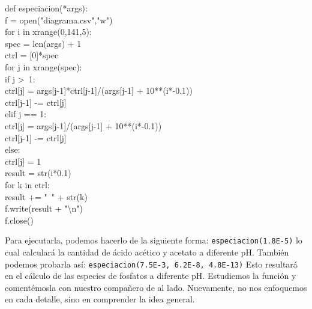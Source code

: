 \documentclass[10pt,letterpaper]{article}
\newcommand{\inlinecode}[1]{
\colorbox{light-gray}{\texttt{#1}}
}
\newenvironment{Code}
{
\begin{lrbox}{\selvestebox}%
\begin{minipage}{\dimexpr\columnwidth-2\fboxsep\relax}
\fontfamily{\ttdefault}\selectfont
}
{\end{minipage}\end{lrbox}%
\begin{center}
\colorbox{light-gray}{\usebox{\selvestebox}}
\end{center}
}
\begin{document}
\begin{Code}
def especiacion(*args):\\
\hspace*{6mm} f = open("diagrama.csv","w")\\
\hspace*{6mm} for i in xrange(0,141,5):\\
\hspace*{13mm} spec = len(args) + 1\\
\hspace*{13mm} ctrl = [0]*spec\\
\hspace*{13mm} for j in xrange(spec):\\
\hspace*{21mm} if j >\ 1:\\
\hspace*{28mm} ctrl[j] = args[j-1]*ctrl[j-1]/(args[j-1] + 10**(i*-0.1))\\
\hspace*{28mm} ctrl[j-1] -= ctrl[j]\\
\hspace*{21mm} elif j == 1:\\
\hspace*{28mm} ctrl[j] = args[j-1]/(args[j-1] + 10**(i*-0.1))\\
\hspace*{28mm} ctrl[j-1] -= ctrl[j]\\
\hspace*{21mm} else:\\
\hspace*{28mm} ctrl[j] = 1\\
\hspace*{13mm} result = str(i*0.1)\\
\hspace*{13mm} for k in ctrl:\\
\hspace*{21mm} result += "\ " + str(k)\\
\hspace*{13mm} f.write(result + "\textbackslash n")\\
\hspace*{6mm} f.close()
\end{Code}

Para ejecutarla, podemos hacerlo de la siguiente forma: \inlinecode{especiacion(1.8E-5)} lo cual calcular\'a la cantidad de \'acido ac\'etico y acetato a diferente pH. Tambi\'en podemos probarla as\'i: \inlinecode{especiacion(7.5E-3, 6.2E-8, 4.8E-13)} Esto resultar\'a en el c\'alculo de las especies de fosfatos a diferente pH. Estudiemos la funci\'on y coment\'emosla con nuestro compa\~nero de al lado. Nuevamente, no nos enfoquemos en cada detalle, sino en comprender la idea general.\\
\end{document}
